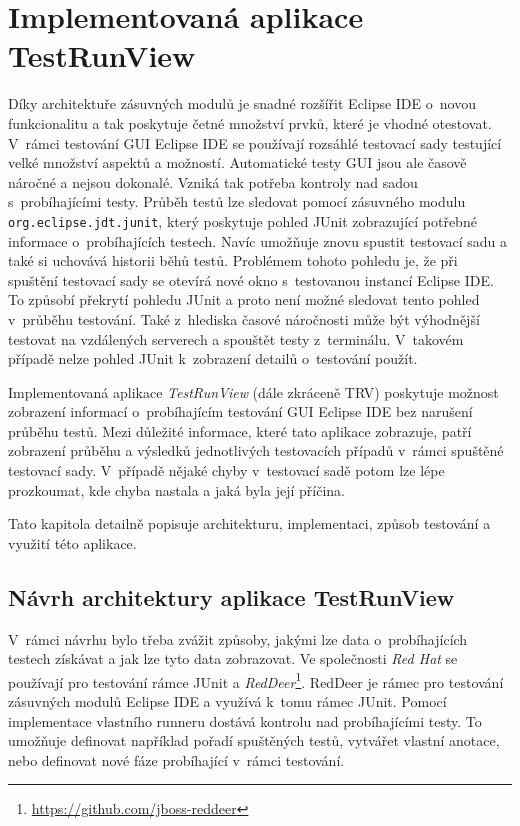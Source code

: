 \chapter{Implementovaná aplikace TestRunView}
\label{chapter:TRV}
Díky architektuře zásuvných modulů je snadné rozšířit Eclipse IDE o~novou funkcionalitu a tak poskytuje četné množství prvků, které je vhodné otestovat. V~rámci testování GUI Eclipse IDE se používají rozsáhlé testovací sady testující velké množství aspektů a možností. Automatické testy GUI jsou ale časově náročné a nejsou dokonalé. Vzniká tak potřeba kontroly nad sadou s~probíhajícími testy. Průběh testů lze sledovat pomocí zásuvného modulu \texttt{org.eclipse.jdt.junit}, který poskytuje pohled JUnit zobrazující potřebné informace o~probíhajících testech. Navíc umožňuje znovu spustit testovací sadu a také si uchovává historii běhů testů. Problémem tohoto pohledu je, že při spuštění testovací sady se otevírá nové okno s~testovanou instancí Eclipse IDE. To způsobí překrytí pohledu JUnit a proto není možné sledovat tento pohled v~průběhu testování. Také z~hlediska časové náročnosti může být výhodnější testovat na vzdálených serverech a spouštět testy z~terminálu. V~takovém případě nelze pohled JUnit k~zobrazení detailů o~testování použít.

Implementovaná aplikace \emph{TestRunView} (dále zkráceně TRV) poskytuje možnost zobrazení informací o~probíhajícím testování GUI Eclipse IDE bez narušení průběhu testů. Mezi důležité informace, které tato aplikace zobrazuje, patří zobrazení průběhu a výsledků jednotlivých testovacích případů v~rámci spuštěné testovací sady. V~případě nějaké chyby v~testovací sadě potom lze lépe prozkoumat, kde chyba nastala a jaká byla její příčina.

Tato kapitola detailně popisuje architekturu, implementaci, způsob testování a využití této aplikace.

  \section{Návrh architektury aplikace TestRunView}

  V~rámci návrhu bylo třeba zvážit způsoby, jakými lze data o~probíhajících testech získávat a jak lze tyto data zobrazovat. Ve společnosti \emph{Red Hat} se používají pro testování rámce JUnit a \emph{RedDeer}\footnote{\url{https://github.com/jboss-reddeer}}. RedDeer je rámec pro testování zásuvných modulů Eclipse IDE a využívá k~tomu rámec JUnit. Pomocí implementace vlastního runneru dostává kontrolu nad probíhajícími testy. To umožňuje definovat například pořadí spuštěných testů, vytvářet vlastní anotace, nebo definovat nové fáze probíhající v~rámci testování.

